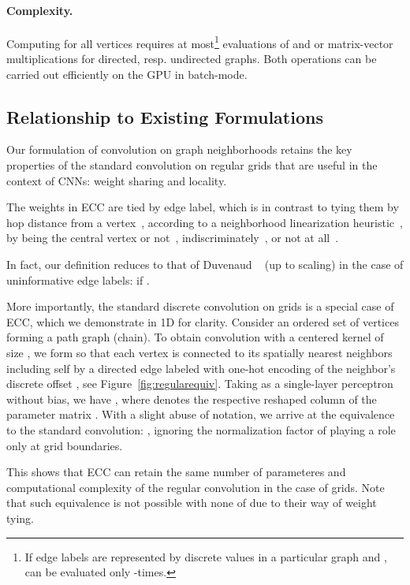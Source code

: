\documentclass[10pt,twocolumn,letterpaper]{article}
\begin{document}
\paragraph*{Complexity.} Computing  for all vertices requires at most\footnote{If edge labels are represented by  discrete values in a particular graph and ,  can be evaluated only -times.}  evaluations of  and  or  matrix-vector multiplications for directed, resp. undirected graphs. Both operations can be carried out efficiently on the GPU in batch-mode.



\subsection{Relationship to Existing Formulations} \label{subsec:relgridconv}


Our formulation of convolution on graph neighborhoods retains the key properties of the standard convolution on regular grids that are useful in the context of CNNs: weight sharing and locality. 

The weights in ECC are tied by edge label, which is in contrast to tying them by hop distance from a vertex~\cite{dcnn}, according to a neighborhood linearization heuristic~\cite{niepert}, by being the central vertex or not~\cite{kipf}, indiscriminately~\cite{duvenaud}, or not at all~\cite{bruna13}.

In fact, our definition reduces to that of Duvenaud \etal~\cite{duvenaud} (up to scaling) in the case of uninformative edge labels: 
 if .

More importantly, the standard discrete convolution on grids is a special case of ECC, which we demonstrate in 1D for clarity. Consider an ordered set of vertices  forming a path graph (chain). To obtain convolution with a centered kernel of size , we form  so that each vertex is connected to its  spatially nearest neighbors including self by a directed edge labeled with one-hot encoding of the neighbor's discrete offset , see Figure~\ref{fig:regularequiv}. Taking  as a single-layer perceptron without bias, we have , where  denotes the respective reshaped column of the parameter matrix . With a slight abuse of notation, we arrive at the equivalence to the standard convolution: , ignoring the normalization factor of  playing a role only at grid boundaries.

This shows that ECC can retain the same number of parameteres and computational complexity of the regular convolution in the case of grids. Note that such equivalence is not possible with none of \cite{dcnn,kipf,duvenaud} due to their way of weight tying.
\end{document}
